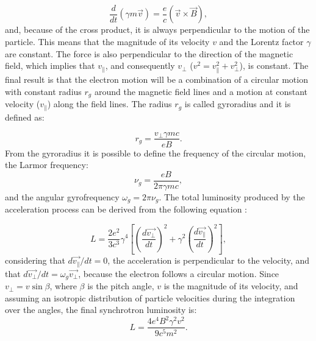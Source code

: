 \documentclass[../main.tex]{subfiles}
\begin{document}
\begin{equation}
    \label{eq:mag_force}
    \frac{d}{dt}(\gamma m \vec{v})=\frac{e}{c}\left(\vec{v}\times\vec{B}\right),
\end{equation}
and, because of the cross product, it is always perpendicular to the motion of the particle.
This means that the magnitude of its velocity $v$ and the Lorentz factor $\gamma$ are constant.
The force is also perpendicular to the direction of the magnetic field, which implies that $v_{\parallel}$, and consequently $v_{\bot}$ ($v^2 = v^2_{\parallel} + v^2_{\bot}$), is constant.
The final result is that the electron motion will be a combination of a circular motion with constant radius $r_g$ around the magnetic field lines and a motion at constant velocity ($v_{\parallel}$) along the field lines.
The radius $r_g$ is called gyroradius and it is defined as:

\begin{equation}
    \label{eq:gyroradius}
    r_g = \frac{v_{\bot}\gamma m c}{e B}.
\end{equation}
From the gyroradius it is possible to define the frequency of the circular motion, the Larmor frequency:
\begin{equation}
    \label{eq:larmor_freq}
    \nu_g = \frac{e B}{2\pi \gamma m c},
\end{equation}
and the angular gyrofrequency $\omega_g = 2\pi \nu_g$.
The total luminosity produced by the acceleration process can be derived from the following equation \citep{Rybicki86}:

\begin{equation}
    \label{eq:rybicki}
    L = \frac{2e^2}{3c^3}\gamma^4\left[\left(\frac{d\vec{v_{\bot}}}{dt}\right)^2+\gamma^2\left(\frac{d\vec{v_{\parallel}}}{dt}\right)^2\right],
\end{equation}
considering that $d\vec{v_{\parallel}}/dt = 0$, the acceleration is perpendicular to the velocity, and that $d\vec{v_{\bot}}/dt = \omega_g\vec{v_{\bot}}$, because the electron follows a circular motion.
Since $v_{\bot} = v\sin\beta$, where $\beta$ is the pitch angle, $v$ is the magnitude of its velocity, and assuming an isotropic distribution of particle velocities during the integration over the angles, the final synchrotron luminosity is:
\begin{equation}
    \label{eq:sync_lum}
    L  = \frac{4e^4B^2\gamma^2v^2}{9c^5m^2}.
\end{equation}
\end{document}
